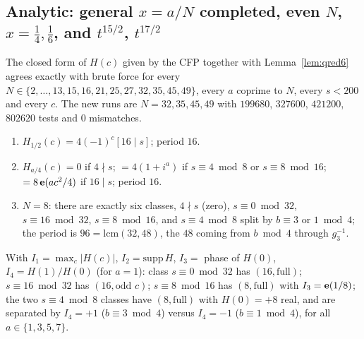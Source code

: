 \subsection{Analytic: general $x=a/N$ completed, even $N$, $x=\tfrac14,\tfrac16$, and $t^{15/2}$, $t^{17/2}$}\label{sec:rev7an}
\begin{proposition}\label{prop:gen7}
The closed form of $H(c)$ given by the CFP together with Lemma~\ref{lem:qred6} agrees exactly with brute force for every $N\in\{2,\dots,13,15,16,21,25,27,32,35,45,49\}$, every $a$ coprime to $N$, every $s<200$ and every $c$. The new runs are $N=32,35,45,49$ with $199680$, $327600$, $421200$, $802620$ tests and $0$ mismatches.
\end{proposition}
\begin{proposition}\label{prop:evenN7}
\begin{enumerate}[label=(\roman*)]
\item $H_{1/2}(c)=4(-1)^c[16\mid s]$; period $16$.
\item $H_{a/4}(c)=0$ if $4\nmid s$; $=4(1+i^a)$ if $s\equiv4\bmod8$ or $s\equiv8\bmod16$; $=8\,\mathbf{e}(ac^2/4)$ if $16\mid s$; period $16$.
\item $N=8$: there are exactly six classes, $4\nmid s$ (zero), $s\equiv0\bmod32$, $s\equiv16\bmod32$, $s\equiv8\bmod16$, and $s\equiv4\bmod8$ split by $b\equiv3$ or $1\bmod4$; the period is $96=\mathrm{lcm}(32,48)$, the $48$ coming from $b\bmod4$ through $g_3^{-1}$.
\end{enumerate}
\end{proposition}
\begin{proposition}[The six $N=8$ classes are pairwise distinct \src{36}, F.2]\label{prop:n8dist7}
With $I_1=\max_c|H(c)|$, $I_2=\mathrm{supp}\,H$, $I_3=$ phase of $H(0)$, $I_4=H(1)/H(0)$ (for $a=1$): class $s\equiv0\bmod32$ has $(16,\text{full})$; $s\equiv16\bmod32$ has $(16,\text{odd }c)$; $s\equiv8\bmod16$ has $(8,\text{full})$ with $I_3=\mathbf{e}(1/8)$; the two $s\equiv4\bmod8$ classes have $(8,\text{full})$ with $H(0)=+8$ real, and are separated by $I_4=+1$ ($b\equiv3\bmod4$) versus $I_4=-1$ ($b\equiv1\bmod4$), for all $a\in\{1,3,5,7\}$.
\end{proposition}
